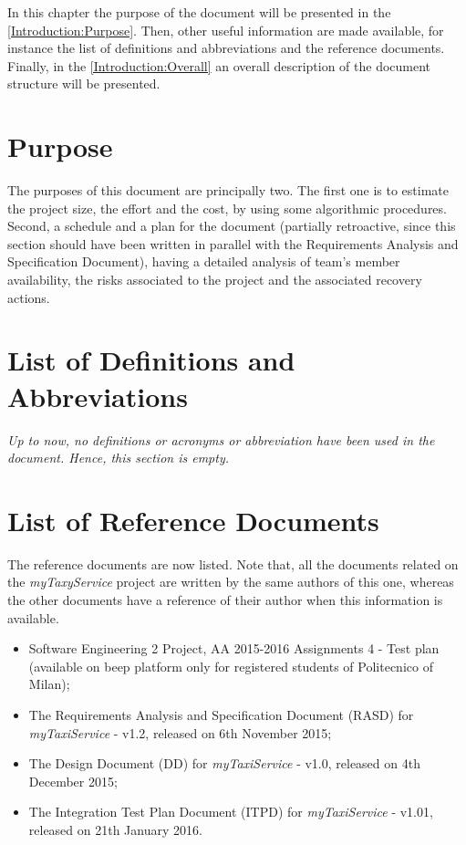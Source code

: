 \documentclass[\mainpath/main]{subfiles}
\begin{document}
\setmyfancystyle

In this chapter the purpose of the document will be presented in the \autoref{Introduction:Purpose}. Then, other useful information are made available, for instance the list of definitions and abbreviations and the reference documents. Finally, in the \autoref{Introduction:Overall} an overall description of the document structure will be presented.

\section{Purpose}
\label{Introduction:Purpose}
The purposes of this document are principally two. The first one is to estimate the project size, the effort and the cost, by using some algorithmic procedures. Second, a schedule and a plan for the document (partially retroactive, since this section should have been written in parallel with the Requirements Analysis and Specification Document), having a detailed analysis of team's member availability, the risks associated to the project and the associated recovery actions.

\section{List of Definitions and Abbreviations}
\label{Introduction:DefinitionsAndAbbrevations}
\textit{Up to now, no definitions or acronyms or abbreviation have been used in the document. Hence, this section is empty.}

\section{List of Reference Documents}
\label{Introduction:ReferenceDocuments}
The reference documents are now listed. Note that, all the documents related on the \textit{myTaxyService} project are written by the same authors of this one, whereas the other documents have a reference of their author when this information is available.\\
\begin{itemize}
	\item Software Engineering 2 Project, AA 2015-2016 Assignments 4 - Test plan (available on beep platform only for registered students of Politecnico of Milan);
	\item The Requirements Analysis and Specification Document (RASD) for \textit{myTaxiService} - v1.2, released on 6th November 2015;
	\item The Design Document (DD) for \textit{myTaxiService} - v1.0, released on 4th December 2015;
	\item The Integration Test Plan Document (ITPD) for \textit{myTaxiService} - v1.01, released on 21th January 2016.
\end{itemize}
\end{document}
